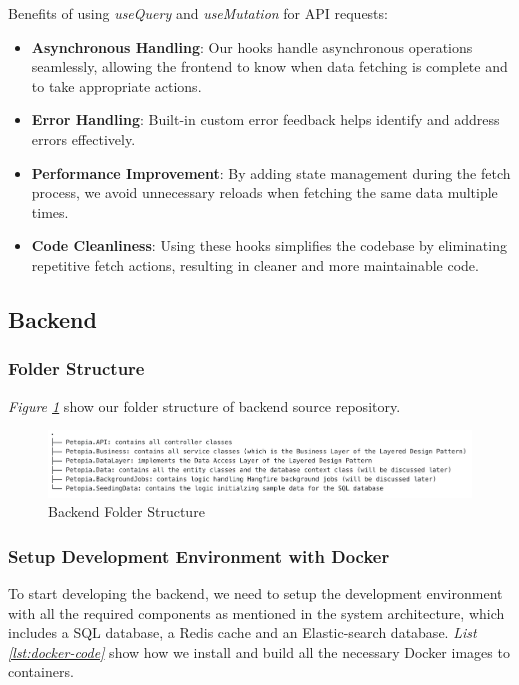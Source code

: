 Benefits of using \textit{useQuery} and \textit{useMutation} for API requests:

\begin{itemize}
    \item \textbf{Asynchronous Handling}: Our hooks handle asynchronous operations seamlessly, allowing the frontend to know when data fetching is complete and to take appropriate actions.
    \item \textbf{Error Handling}: Built-in custom error feedback helps identify and address errors effectively.
    \item \textbf{Performance Improvement}: By adding state management during the fetch process, we avoid unnecessary reloads when fetching the same data multiple times.
    \item \textbf{Code Cleanliness}: Using these hooks simplifies the codebase by eliminating repetitive fetch actions, resulting in cleaner and more maintainable code.
\end{itemize}

\subsection{Backend}


\subsubsection*{Folder Structure}

\textit{Figure \ref{fig:be-folder}} show our folder structure of backend
source repository.

\begin{figure}[H]
  \centering
  \includegraphics[width=1\textwidth]{Figures/be_folder.png}
  \caption{Backend Folder Structure}
  \label{fig:be-folder}
\end{figure}

\subsubsection*{Setup Development Environment with Docker}

To start developing the backend, we need to setup the development environment with
all the required components as mentioned in the system architecture, which includes a SQL database, a Redis cache and an Elastic-search database.
\textit{List \ref{lst:docker-code}} show how we install and build all the necessary Docker images to containers.


